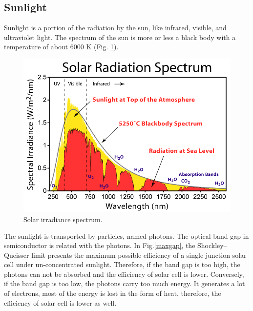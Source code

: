 \documentclass[a4paper, 12pt, titlepage,oneside,drop]{kthesis}
\begin{document}
\subsection{Sunlight}
Sunlight is a portion of the radiation by the sun, like infrared, visible, and ultraviolet light.
The spectrum of the sun is more or less a black body with a temperature of about 6000 K (Fig. \ref{spectrumsun}). 



\begin{figure}[H]
\centering
\includegraphics[scale=.32]{spectrumsun.png}
\caption{Solar irradiance spectrum.}
\label{spectrumsun}
\end{figure}

The sunlight is transported by particles, named photons. The optical band gap in semiconductor is related with the photons. In Fig.\ref{maxgap}, the Shockley–Queisser limit presents 
the maximum possible efficiency of a single junction solar cell under un-concentrated sunlight. Therefore, if the band gap is too high, the photons can not be absorbed and 
the efficiency of solar cell is lower. Conversely, if the band gap is too low, the photons carry too much energy. It generates a lot of electrons, most of the energy is lost in the form of heat, therefore, the efficiency of
solar cell is lower as well. 
 
\end{document}
